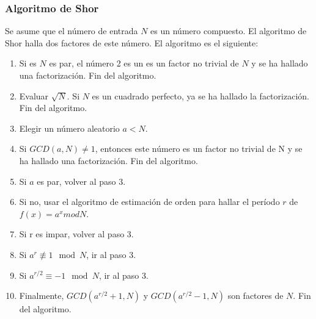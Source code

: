 \documentclass[xetex,mathserif,serif]{beamer}
\begin{document}
\begin{frame}
    \frametitle{Algoritmo de Shor}

    Se asume que el número de entrada $N$ es un número compuesto. El algoritmo de Shor halla dos factores de este número. El algoritmo es el siguiente:

    \begin{enumerate}
        \item Si es $N$ es par, el número 2 es un es un factor no trivial de $N$ y se ha hallado una factorización. Fin del algoritmo.
        \item Evaluar $\sqrt{N}$. Si $N$ es un cuadrado perfecto, ya se ha hallado la factorización. Fin del algoritmo.
        \item Elegir un número aleatorio $a < N$.
        \item Si $GCD(a,N) \neq 1$, entonces este número es un factor no trivial de N y se ha hallado una factorización. Fin del algoritmo.
        \item Si $a$ es par, volver al paso 3.
        \item Si no, usar el algoritmo de estimación de orden para hallar el período $r$ de $f(x) = a^x mod N$.
        \item Si r es impar, volver al paso 3.
        \item Si $a^{r} \not\equiv 1 \mod N$, ir al paso 3.
        \item Si $a^{r/2} \equiv -1 \mod N$, ir al paso 3.
        \item Finalmente, $GCD(a^{r/2} + 1, N)$ y $GCD(a^{r/2} - 1, N)$ son factores de $N$. Fin del algoritmo.
    \end{enumerate}

\end{frame}
\end{document}

